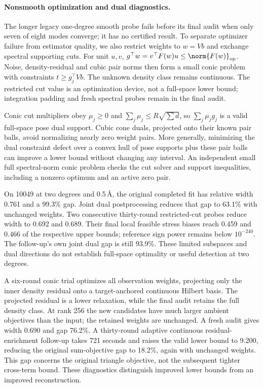 \paragraph{Nonsmooth optimization and dual diagnostics.}
The longer legacy one-degree smooth probe fails before its final audit when
only seven of eight modes converge; it has no certified result. To separate
optimizer failure from estimator quality, we also restrict weights to $w=Vb$
and exchange spectral supporting cuts. For unit $u,v$,
$g^\top w=v^\top F(w)u\le\norm{F(w)}_{\rm op}$.
Noise, density-residual and cubic pair norms then form a small conic problem
with constraints $t\ge g_j^\top Vb$. The unknown density class remains
continuous. The restricted cut value is an optimization device, not a
full-space lower bound; integration padding and fresh spectral probes remain
in the final audit.

Conic cut multipliers obey $\mu_j\ge0$ and $\sum_j\mu_j\le
R\sqrt{\sum d}$, so $\sum_j\mu_jg_j$ is a valid full-space pose dual
support. Cubic cone duals, projected onto their known pair balls, avoid
normalizing nearly zero weight pairs. More generally, minimizing the dual
constraint defect over a convex hull of pose supports plus these pair balls
can improve a lower bound without changing any interval. An independent
small full spectral-norm conic problem checks the cut solver and support
inequalities, including a nonzero optimum and an active zero pair.

On 10049 at two degrees and 0.5\,\AA, the original completed fit has relative
width 0.761 and a 99.3\% gap. Joint dual postprocessing reduces that gap to
63.1\% with unchanged weights. Two consecutive thirty-round restricted-cut
probes reduce width to 0.692 and 0.689. Their final local feasible stress
biases reach 0.459 and 0.466 of the respective upper bounds; reference sign
power remains below $10^{-240}$. The follow-up's own joint dual gap is still
93.9\%. These limited subspaces and dual directions do not establish full-space
optimality or useful detection at two degrees.

A six-round conic trial optimizes all observation weights, projecting only
the inner density residual onto a target-anchored continuous Hilbert basis.
The projected residual is a lower relaxation, while the final audit retains
the full density class. At rank 256 the new candidates have much larger
ambient objectives than the input; the retained weights are unchanged.
A fresh audit gives width 0.690 and gap 76.2\%. A thirty-round adaptive
continuous residual-enrichment follow-up takes 721 seconds and raises the
valid lower bound to 9.200, reducing the original sum-objective gap to
18.2\%, again with unchanged weights. This gap concerns the original triangle
objective, not the subsequent tighter cross-term bound. These diagnostics
distinguish improved lower bounds from an improved reconstruction.

